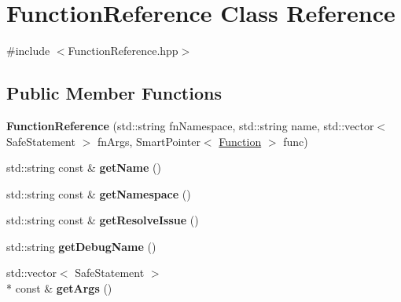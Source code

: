 \hypertarget{class_function_reference}{\section{Function\-Reference Class Reference}
\label{class_function_reference}
}


{\ttfamily \#include $<$Function\-Reference.\-hpp$>$}

\subsection*{Public Member Functions}
\begin{DoxyCompactItemize}
\item 
\hypertarget{class_function_reference_a9939620059844d091367103e2d657867}{{\bfseries Function\-Reference} (std\-::string fn\-Namespace, std\-::string name, std\-::vector$<$ Safe\-Statement $>$ fn\-Args, Smart\-Pointer$<$ \hyperlink{class_a_p_i_1_1_function}{Function} $>$ func)}\label{class_function_reference_a9939620059844d091367103e2d657867}

\item 
\hypertarget{class_function_reference_a68ea0f0cee715228bc660f95f0fcd016}{std\-::string const \& {\bfseries get\-Name} ()}\label{class_function_reference_a68ea0f0cee715228bc660f95f0fcd016}

\item 
\hypertarget{class_function_reference_af975e6578e6a58d30b8685b4844b1b34}{std\-::string const \& {\bfseries get\-Namespace} ()}\label{class_function_reference_af975e6578e6a58d30b8685b4844b1b34}

\item 
\hypertarget{class_function_reference_a0e51c0a0efe3de2757520c2a328e759f}{std\-::string const \& {\bfseries get\-Resolve\-Issue} ()}\label{class_function_reference_a0e51c0a0efe3de2757520c2a328e759f}

\item 
\hypertarget{class_function_reference_a988cd1538d93359e1c0ec955f898e728}{std\-::string {\bfseries get\-Debug\-Name} ()}\label{class_function_reference_a988cd1538d93359e1c0ec955f898e728}

\item 
\hypertarget{class_function_reference_a622d54ff64f7c29624461bab1652491b}{std\-::vector$<$ Safe\-Statement $>$\\*
 const \& {\bfseries get\-Args} ()}\label{class_function_reference_a622d54ff64f7c29624461bab1652491b}


\end{DoxyCompactItemize}
